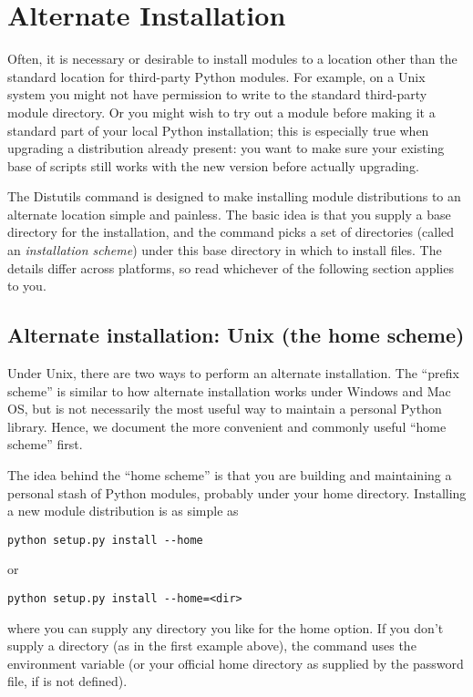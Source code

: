 \documentclass{howto}
\newcommand{\command}[1]{\code{#1}}
\newcommand{\option}[1]{\textsf{\small{#1}}}
\begin{document}
\section{Alternate Installation}
\label{sec:alt-install}

Often, it is necessary or desirable to install modules to a location
other than the standard location for third-party Python modules.  For
example, on a Unix system you might not have permission to write to the
standard third-party module directory.  Or you might wish to try out a
module before making it a standard part of your local Python
installation; this is especially true when upgrading a distribution
already present: you want to make sure your existing base of scripts
still works with the new version before actually upgrading.

The Distutils \command{install} command is designed to make installing
module distributions to an alternate location simple and painless.  The
basic idea is that you supply a base directory for the installation, and
the \command{install} command picks a set of directories (called an
\emph{installation scheme}) under this base directory in which to
install files.  The details differ across platforms, so read whichever
of the following section applies to you.


\subsection{Alternate installation: Unix (the home scheme)}
\label{sec:alt-unix-prefix}

Under Unix, there are two ways to perform an alternate installation.
The ``prefix scheme'' is similar to how alternate installation works
under Windows and Mac OS, but is not necessarily the most useful way to
maintain a personal Python library.  Hence, we document the more
convenient and commonly useful ``home scheme'' first.

The idea behind the ``home scheme'' is that you are building and
maintaining a personal stash of Python modules, probably under your home 
directory.  Installing a new module distribution is as simple as
\begin{verbatim}
python setup.py install --home
\end{verbatim}
or
\begin{verbatim}
python setup.py install --home=<dir>
\end{verbatim}
where you can supply any directory you like for the \option{home}
option.  If you don't supply a directory (as in the first example
above), the \command{install} command uses the  environment
variable (or your official home directory as supplied by the password
file, if  is not defined).
\end{document}
